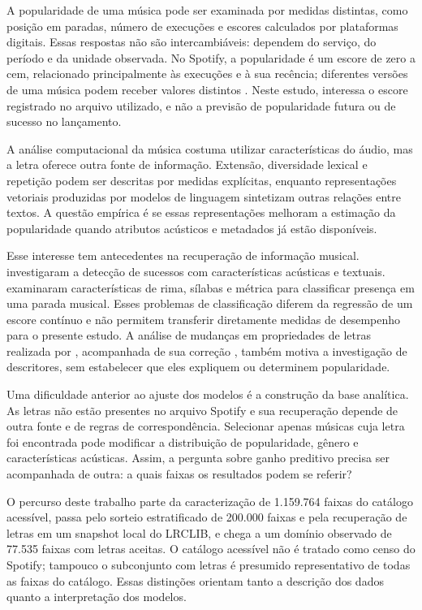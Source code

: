 A popularidade de uma música pode ser examinada por medidas distintas, como posição em paradas, número de execuções e escores calculados por plataformas digitais. Essas respostas não são intercambiáveis: dependem do serviço, do período e da unidade observada. No Spotify, a popularidade é um escore de zero a cem, relacionado principalmente às execuções e à sua recência; diferentes versões de uma música podem receber valores distintos \cite{spotifydocs}. Neste estudo, interessa o escore registrado no arquivo utilizado, e não a previsão de popularidade futura ou de sucesso no lançamento.

A análise computacional da música costuma utilizar características do áudio, mas a letra oferece outra fonte de informação. Extensão, diversidade lexical e repetição podem ser descritas por medidas explícitas, enquanto representações vetoriais produzidas por modelos de linguagem sintetizam outras relações entre textos. A questão empírica é se essas representações melhoram a estimação da popularidade quando atributos acústicos e metadados já estão disponíveis.

Esse interesse tem antecedentes na recuperação de informação musical.  investigaram a detecção de sucessos com características acústicas e textuais.  examinaram características de rima, sílabas e métrica para classificar presença em uma parada musical. Esses problemas de classificação diferem da regressão de um escore contínuo e não permitem transferir diretamente medidas de desempenho para o presente estudo. A análise de mudanças em propriedades de letras realizada por , acompanhada de sua correção \cite{parada2024correction}, também motiva a investigação de descritores, sem estabelecer que eles expliquem ou determinem popularidade.

Uma dificuldade anterior ao ajuste dos modelos é a construção da base analítica. As letras não estão presentes no arquivo Spotify e sua recuperação depende de outra fonte e de regras de correspondência. Selecionar apenas músicas cuja letra foi encontrada pode modificar a distribuição de popularidade, gênero e características acústicas. Assim, a pergunta sobre ganho preditivo precisa ser acompanhada de outra: a quais faixas os resultados podem se referir?

O percurso deste trabalho parte da caracterização de 1.159.764 faixas do catálogo acessível, passa pelo sorteio estratificado de 200.000 faixas e pela recuperação de letras em um snapshot local do LRCLIB, e chega a um domínio observado de 77.535 faixas com letras aceitas. O catálogo acessível não é tratado como censo do Spotify; tampouco o subconjunto com letras é presumido representativo de todas as faixas do catálogo. Essas distinções orientam tanto a descrição dos dados quanto a interpretação dos modelos.

